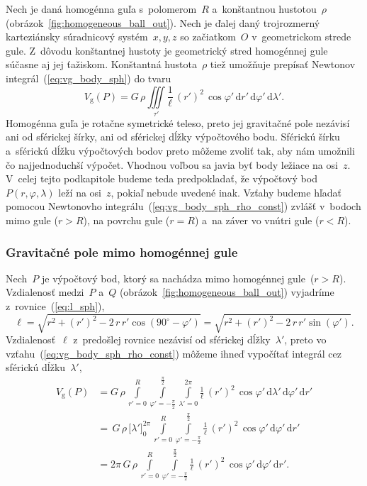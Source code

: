 \documentclass[a4paper, 12pt]{book}
\newcommand{\diff}{\mathrm d}
\newcommand{\gidx}{\mathrm g}
\begin{document}
Nech je daná homogénna guľa s~polomerom~$R$ a~konštantnou hustotou~$\rho$ 
(obrázok~\ref{fig:homogeneous_ball_out}).  Nech je ďalej daný trojrozmerný 
karteziánsky súradnicový systém~$x, y, z$ so začiatkom~$O$ v~geometrickom 
strede gule.  Z~dôvodu konštantnej hustoty je geometrický stred homogénnej gule 
súčasne aj jej ťažiskom.  Konštantná hustota~$\rho$ tiež umožňuje prepísať 
Newtonov integrál~(\ref{eq:vg_body_sph}) do tvaru
%
\begin{equation}
\label{eq:vg_body_sph_rho_const}
V_\gidx(P) = G \, \rho \iiint\limits_{\tau'} \frac{1}{\ell} \, (r')^2 \, 
\cos\varphi' \, \diff r' \, \diff \varphi' \, \diff \lambda'{.}
\end{equation}
%
Homogénna guľa je rotačne symetrické teleso, preto jej gravitačné pole nezávisí 
ani od sférickej šírky, ani od sférickej dĺžky výpočtového bodu.  Sférickú 
šírku a~sférickú dĺžku výpočtových bodov preto môžeme zvoliť tak, aby nám 
umožnili čo najjednoduchší výpočet.  Vhodnou voľbou sa javia byť body ležiace 
na osi~$z$.  V~celej tejto podkapitole budeme teda predpokladať, že výpočtový 
bod~$P(r, \varphi, \lambda)$ leží na osi~$z$, pokiaľ nebude uvedené inak.  
Vzťahy budeme hľadať pomocou Newtonovho 
integrálu~(\ref{eq:vg_body_sph_rho_const}) zvlášť v~bodoch mimo gule ($r > R$), 
na povrchu gule ($r = R$) a~na záver vo vnútri gule ($r < R$).

\subsubsection{Gravitačné pole mimo homogénnej gule}

Nech~$P$ je výpočtový bod, ktorý sa nachádza mimo homogénnej gule~($r > R$).  
Vzdialenosť medzi~$P$ a~$Q$ (obrázok~\ref{fig:homogeneous_ball_out}) vyjadríme 
z~rovnice~(\ref{eq:l_sph}),
%
\begin{equation}
\label{eq:l_sph_ball}
\ell = \sqrt{r^2 + (r')^2 - 2 \, r \, r' \cos(90^{\circ} - \varphi')} 
= \sqrt{r^2 + (r')^2 - 2 \, r \, r' \sin(\varphi')}{.}
\end{equation}
%
Vzdialenosť~$\ell$ z~predošlej rovnice nezávisí od sférickej dĺžky~$\lambda'$, 
preto vo vzťahu~(\ref{eq:vg_body_sph_rho_const}) môžeme ihneď vypočítať 
integrál cez sférickú dĺžku~$\lambda'$,
%
\begin{equation}
\label{eq:vg_ball_sph}
\begin{split}
V_\gidx(P) &= G \, \rho \, \int\limits_{r' = 0}^{R} \int\limits_{\varphi' 
= -\frac{\pi}{2}}^{\frac{\pi}{2}} \int\limits_{\lambda' = 0}^{2\pi} 
\frac{1}{\ell} \, (r')^2 \, \cos\varphi' \, \diff \lambda' \, \diff \varphi' \, 
\diff r'\\
%
&=\, G \, \rho \, \big[ \lambda' \big]_{0}^{2\pi} \, \int\limits_{r' = 0}^{R} 
\int\limits_{\varphi' = -\frac{\pi}{2}}^{\frac{\pi}{2}} \frac{1}{\ell} \, 
(r')^2 \, \cos\varphi' \, \diff \varphi' \, \diff r'\\
%
&=2\pi \, G \, \rho \, \int\limits_{r' = 0}^{R} \int\limits_{\varphi' 
= -\frac{\pi}{2}}^{\frac{\pi}{2}} \frac{1}{\ell} \, (r')^2 \, \cos\varphi' \, 
\diff \varphi' \, \diff r'{.}
\end{split}
\end{equation}
\end{document}
